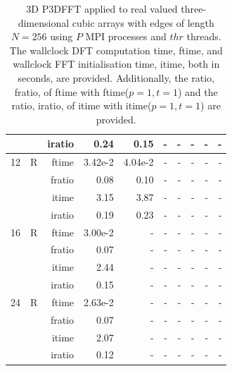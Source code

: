 \documentclass[a4paper]{article}
\begin{document}
\begin{table}[htbp]
\begin{center}
\begin{small}
\begin{tabular}{|r|r|r|r|r|r|r|r|r|r|}
             &             &  iratio &    0.24 &    0.15 &      - &      - &      - &      - &      - \\\hline
   12 &   R &   ftime &    3.42e-2 &    4.04e-2 &      - &      - &      - &      - &      - \\
             &             &  fratio &    0.08 &   0.10 &      - &      - &      - &      - &      - \\
             &             &  itime &    3.15  &    3.87  &      - &      - &      - &      - &      - \\
             &             &  iratio &   0.19 &    0.23 &      - &      - &      - &      - &      - \\\hline
   16 &   R &   ftime &    3.00e-2 &      - &      - &      - &      - &      - &      - \\
             &             &  fratio &    0.07 &     - &      - &      - &      - &      - &      - \\
             &             &  itime &    2.44  &      - &      - &      - &      - &      - &      - \\
             &             &  iratio &    0.15 &      - &      - &      - &      - &      - &      - \\\hline
   24 &   R &   ftime &    2.63e-2 &      - &      - &      - &      - &      - &      - \\
             &             &  fratio &    0.07 &     - &      - &      - &      - &      - &      - \\
             &             &  itime &    2.07  &      - &      - &      - &      - &      - &      - \\
             &             &  iratio &    0.12 &      - &      - &      - &      - &      - &      - \\\hline


\end{tabular}
\caption{3D P3DFFT applied to real valued three-dimensional cubic arrays with edges of length $N=256$ using $P$ MPI processes and $thr$ threads. The wallclock DFT computation time, ftime, and wallclock FFT initialisation time, itime, both in seconds, are provided. Additionally, the ratio, fratio, of ftime  with ftime($p=1,t=1$) and the ratio, iratio, of itime  with itime($p=1,t=1$) are provided. }\label{TblP3DFFT3d256}
\end{small}
\end{center}
\end{table}
\end{document}
